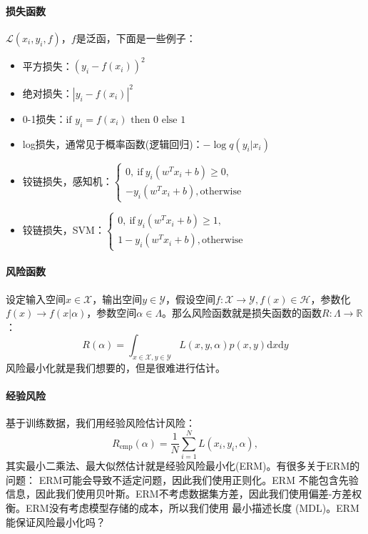 \paragraph{损失函数} $\mathcal{L}(x_i,y_i,f)$，$f$是泛函，下面是一些例子：
\begin{itemize}
    \item 平方损失：$(y_i - f(x_i))^2$
    \item 绝对损失：$|y_i - f(x_i)|^2$
    \item 0-1损失：$\text{if $y_i = f(x_i)$ then 0 else 1}$
    \item log损失，通常见于概率函数(逻辑回归)：$-\log q(y_i|x_i)$
    \item 铰链损失，感知机：$\left\{\begin{aligned}
        0, \ \text{if}\ y_i(w^Tx_i +b) \ge 0, \\
        -y_i(w^Tx_i +b), \text{otherwise}
    \end{aligned}\right.$
    \item 铰链损失，SVM：$\left\{\begin{aligned}
        0, \ \text{if}\ y_i(w^Tx_i +b) \ge 1, \\
        1-y_i(w^Tx_i +b), \text{otherwise}
    \end{aligned}\right.$
\end{itemize}

\paragraph{风险函数}
设定输入空间$x\in \mathcal{X}$，输出空间$y\in \mathcal{Y}$，假设空间$f: \mathcal{X} \to \mathcal{Y}, f(x) \in \mathcal{H}$，参数化$f(x) \to f(x|\alpha)$，参数空间$\alpha \in \Lambda$。那么风险函数就是损失函数的函数$R: \Lambda \to \mathbb{R}$：
$$R(\alpha) = \int_{x\in \mathcal{X}, y\in \mathcal{Y}} L(x, y, \alpha)p(x,y) \mathrm{d}x\mathrm{d}y$$
风险最小化就是我们想要的，但是很难进行估计。

\paragraph{经验风险} 基于训练数据，我们用经验风险估计风险：
$$R_\text{emp}(\alpha) = \frac{1}{N} \sum^N_{i=1}L(x_i, y_i, \alpha),$$
其实最小二乘法、最大似然估计就是经验风险最小化(ERM)。有很多关于ERM的问题：
ERM可能会导致不适定问题，因此我们使用正则化。ERM 不能包含先验信息，因此我们使用贝叶斯。ERM不考虑数据集方差，因此我们使用偏差-方差权衡。ERM没有考虑模型存储的成本，所以我们使用
最小描述长度 (MDL)。ERM能保证风险最小化吗？ 

